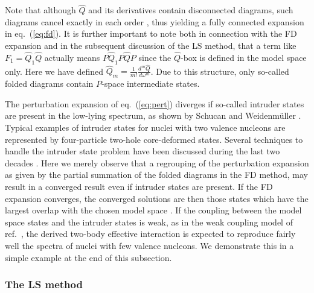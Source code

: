 Note that although $\hat{Q}$ and its derivatives contain disconnected
diagrams, such diagrams cancel exactly in each order \cite{ko90}, thus
yielding a fully connected expansion in eq.\ (\ref{eq:fd}).
It is further important to note both in connection with the FD expansion and in
the subsequent discussion of the LS method, that a term like
$F_1= \hat{Q}_1 \hat{Q}$ actually means $P\hat{Q}_1 P\hat{Q}P$ since
the $\hat{Q}$-box is defined in the model space only. Here we have defined
$\hat{Q}_{m}=\frac{1}{m!}\frac{d^{m}\hat{Q}}
{d\omega^{m}}$.
Due to this structure, only so-called folded diagrams
contain $P$-space intermediate states.

The perturbation expansion of eq.\ (\ref{eq:pert})
diverges if so-called intruder states are
present in the low-lying spectrum, as shown by Schucan and Weidenm\"{u}ller
\cite{sw72}. Typical examples of intruder states for nuclei with
two valence nucleons are represented by four-particle two-hole
core-deformed
states. Several techniques to handle the intruder state problem
have been discussed during the last two decades \cite{eo77,lk75,lk77,sm90}.
Here we merely observe that a regrouping of the perturbation expansion
as given by the partial summation of the folded diagrams in the FD method,
may result in a converged result even if intruder states are present.
If the FD expansion converges, the converged solutions are then those states
which have the largest overlap with the chosen model space \cite{ls80}.
If the coupling between the model space states and the intruder states
is weak, as in the weak coupling model of ref.\ \cite{ee70}, the
derived two-body effective interaction is expected to reproduce fairly well
the spectra of nuclei with few valence nucleons.  We demonstrate this 
in a simple example at the end of this subsection.

\subsubsection{The LS method}

